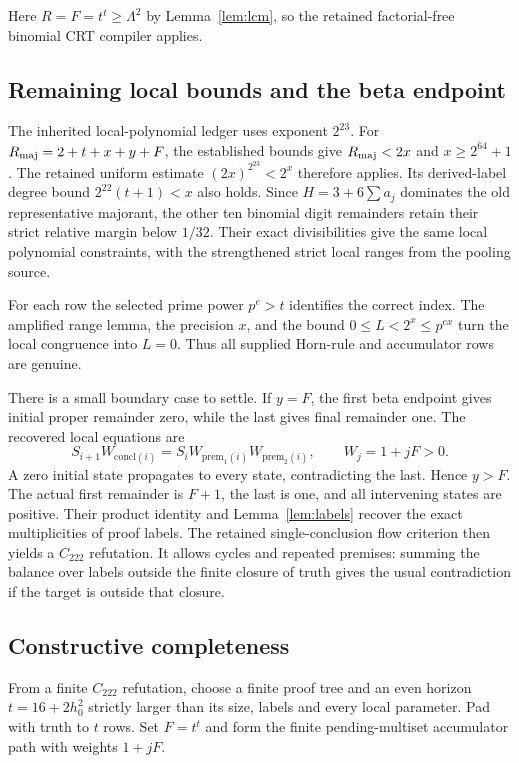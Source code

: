 Here $R=F=t^t\ge\Lambda^2$ by Lemma~\ref{lem:lcm}, so the
retained factorial-free binomial CRT compiler applies.

\subsection{Remaining local bounds and the beta endpoint}

The inherited local-polynomial ledger uses exponent $2^{23}$.
For $R_{\rm maj}=2+t+x+y+F$, the established bounds give
$R_{\rm maj}<2x$ and $x\ge2^{64}+1$. The retained uniform estimate
$(2x)^{2^{23}}<2^x$ therefore applies. Its derived-label degree
bound $2^{22}(t+1)<x$ also holds. Since $H=3+6\sum a_j$ dominates
the old representative majorant, the other ten binomial digit
remainders retain their strict relative margin below $1/32$.
Their exact divisibilities give the same local polynomial constraints,
with the strengthened strict local ranges from the pooling source.

For each row the selected prime power $p^e>t$ identifies the correct
index. The amplified range lemma, the precision $x$, and the bound
$0\le L<2^x\le p^{ex}$ turn the local congruence into $L=0$.
Thus all supplied Horn-rule and accumulator rows are genuine.

There is a small boundary case to settle. If $y=F$, the first beta
endpoint gives initial proper remainder zero, while the last gives
final remainder one. The recovered local equations are
\[
 S_{i+1}W_{\mathrm{concl}(i)}
  =S_iW_{\mathrm{prem}_1(i)}W_{\mathrm{prem}_2(i)},
 \qquad W_j=1+jF>0.
\]
A zero initial state propagates to every state, contradicting the last.
Hence $y>F$. The actual first remainder is $F+1$, the last is one,
and all intervening states are positive. Their product identity and
Lemma~\ref{lem:labels} recover the exact multiplicities of proof labels.
The retained single-conclusion flow criterion then yields a $C_{222}$
refutation. It allows cycles and repeated premises: summing the balance
over labels outside the finite closure of truth gives the usual
contradiction if the target is outside that closure.

\subsection{Constructive completeness}

From a finite $C_{222}$ refutation, choose a finite proof tree and an
even horizon $t=16+2h_0^2$ strictly larger than its size, labels and
every local parameter. Pad with truth to $t$ rows. Set $F=t^t$ and
form the finite pending-multiset accumulator path with weights $1+jF$.

